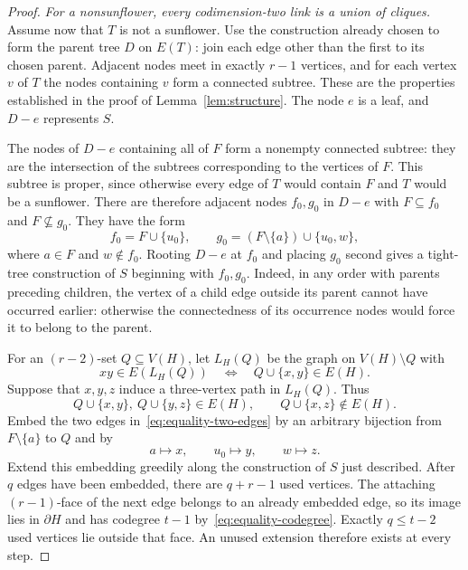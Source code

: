 \documentclass[11pt]{article}
\theoremstyle{remark}
\numberwithin{equation}{section}
\newcommand{\sh}{\partial}
\begin{document}
\begin{proof}
		\medskip\noindent
		\emph{For a nonsunflower, every codimension-two link is a union
			of cliques.}
		Assume now that $T$ is not a sunflower. Use the construction
		already chosen to form the parent tree $D$ on $E(T)$: join each
		edge other than the first to its chosen parent. Adjacent nodes
		meet in exactly $r-1$ vertices, and for each vertex $v$ of $T$
		the nodes containing $v$ form a connected subtree. These are
		the properties established in the proof of
		Lemma~\ref{lem:structure}. The node $e$ is a leaf, and $D-e$
		represents $S$.
		
		\bigskip
		
		The nodes of $D-e$ containing all of $F$ form a nonempty
		connected subtree: they are the intersection of the subtrees
		corresponding to the vertices of $F$. This subtree is proper,
		since otherwise every edge of $T$ would contain $F$ and $T$
		would be a sunflower. There are therefore adjacent nodes
		$f_0,g_0$ in $D-e$ with $F\subseteq f_0$ and
		$F\nsubseteq g_0$. They have the form
		\begin{equation}\label{eq:equality-two-edges}
			f_0=F\cup\{u_0\},
			\qquad
			g_0=(F\setminus\{a\})\cup\{u_0,w\},
		\end{equation}
		where $a\in F$ and $w\notin f_0$.
		Rooting $D-e$ at $f_0$ and placing $g_0$ second gives a
		tight-tree construction of $S$ beginning with $f_0,g_0$.
		Indeed, in any order with parents preceding children, the
		vertex of a child edge outside its parent cannot have occurred
		earlier: otherwise the connectedness of its occurrence nodes
		would force it to belong to the parent.
		
		\bigskip
		
		For an $(r-2)$-set $Q\subseteq V(H)$, let $L_H(Q)$ be the
		graph on $V(H)\setminus Q$ with
		\[
		xy\in E(L_H(Q))
		\quad\Longleftrightarrow\quad
		Q\cup\{x,y\}\in E(H).
		\]
		Suppose that $x,y,z$ induce a three-vertex path in $L_H(Q)$.
		Thus
		\begin{equation}\label{eq:equality-link-path}
			Q\cup\{x,y\},\ Q\cup\{y,z\}\in E(H),
			\qquad Q\cup\{x,z\}\notin E(H).
		\end{equation}
		Embed the two edges in~\eqref{eq:equality-two-edges} by an
		arbitrary bijection from $F\setminus\{a\}$ to $Q$ and by
		\[
		a\mapsto x,\qquad u_0\mapsto y,\qquad w\mapsto z.
		\]
		Extend this embedding greedily along the construction of $S$
		just described. After $q$ edges have been embedded, there are
		$q+r-1$ used vertices. The attaching $(r-1)$-face of the next
		edge belongs to an already embedded edge, so its image lies in
		$\sh H$ and has codegree $t-1$ by~\eqref{eq:equality-codegree}.
		Exactly $q\le t-2$ used vertices lie outside that face. An
		unused extension therefore exists at every step.
		

\end{proof}
\end{document}
